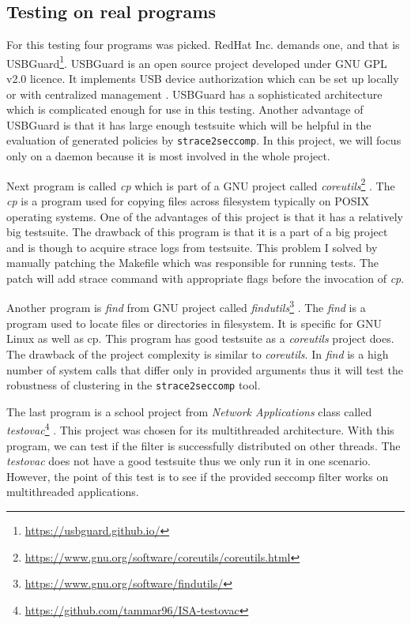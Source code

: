 \subsection{Testing on real programs}
For this testing four programs was picked. RedHat Inc. demands one, and that is
USBGuard\footnote{\url{https://usbguard.github.io/}}. USBGuard is an open source
project developed under GNU GPL v2.0 licence. It implements USB device
authorization which can be set up locally or with centralized
management \cite{usbguardCentralized}. USBGuard has a sophisticated architecture
which is complicated enough for use in this testing. Another advantage of
USBGuard is that it has large enough testsuite which will be helpful in the
evaluation of generated policies by \texttt{strace2seccomp}. In this project, we
will focus only on a daemon because it is most involved in the whole project.

Next program is called \emph{cp} which is part of a GNU project called
\emph{coreutils}\footnote{\url{https://www.gnu.org/software/coreutils/coreutils.html}} .
The \emph{cp} is a program used for copying files across filesystem typically on
POSIX operating systems. One of the advantages of this project is that it has a
relatively big testsuite. The drawback of this program is that it is a part of a
big project and is though to acquire strace logs from testsuite. This problem I
solved by manually patching the Makefile which was responsible for running
tests. The patch will add strace command with appropriate flags before the
invocation of \emph{cp}.

Another program is \emph{find} from GNU project called
\emph{findutils}\footnote{\url{https://www.gnu.org/software/findutils/}} . The
\emph{find} is a program used to locate files or directories in filesystem. It
is specific for GNU Linux as well as cp. This program has good testsuite as a
\emph{coreutils} project does. The drawback of the project complexity is similar to
\emph{coreutils}. In \emph{find} is a high number of system calls that differ
only in provided arguments thus it will test the robustness of clustering in the
\texttt{strace2seccomp} tool.

The last program is a school project from \emph{Network Applications} class called
\emph{testovac}\footnote{\url{https://github.com/tammar96/ISA-testovac}} . This
project was chosen for its multithreaded architecture. With this program, we can
test if the filter is successfully distributed on other threads. The
\emph{testovac} does not have a good testsuite thus we only run it in one
scenario. However, the point of this test is to see if the provided seccomp
filter works on multithreaded applications.

